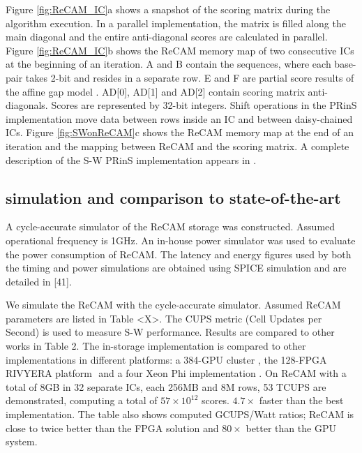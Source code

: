 \documentclass{superfri}
\begin{document}
Figure \ref{fig:ReCAM_IC}a shows a snapshot of the scoring matrix during the algorithm execution. In a parallel implementation, the matrix is filled along the main diagonal and the entire anti-diagonal scores are calculated in parallel. Figure \ref{fig:ReCAM_IC}b shows the ReCAM memory map of two consecutive ICs at the beginning of an iteration. A and B contain the sequences, where each base-pair takes 2-bit and resides in a separate row. E and F are partial score results of the affine gap model \cite{giridhar2013exploring}. AD[0], AD[1] and AD[2] contain scoring matrix anti-diagonals. Scores are represented by 32-bit integers. Shift operations in the PRinS implementation move data between rows inside an IC and between daisy-chained ICs. Figure \ref{fig:SWonReCAM}c shows the ReCAM memory map at the end of an iteration and the mapping between ReCAM and the scoring matrix. A complete description of the S-W PRinS implementation appears in \cite{kaplan2017resistive}.

\subsection{simulation and comparison to state-of-the-art}
\label{sec:SW_simulation}
A cycle-accurate simulator of the ReCAM storage was constructed. Assumed operational frequency is 1GHz. An in-house power simulator was used to evaluate the power consumption of ReCAM. The latency and energy figures used by both the timing and power simulations are obtained using SPICE simulation and are detailed in [41]. 


We simulate the ReCAM with the cycle-accurate simulator. Assumed ReCAM parameters are listed in Table <X>. The CUPS metric (Cell Updates per Second) is used to measure S-W performance. Results are compared to other works in Table 2. The in-storage implementation is compared to other implementations in different platforms: a 384-GPU cluster \cite{de2016cudalign}, the 128-FPGA RIVYERA platform ‎\cite{wienbrandt2014fpga} and a four Xeon Phi implementation \cite{liu2014swaphi}. On ReCAM with a total of 8GB in 32 separate ICs, each 256MB and 8M rows, 53 TCUPS are demonstrated, computing a total of $57\times10^{12}$ scores. $4.7\times$ faster than the best implementation. The table also shows computed GCUPS/Watt ratios; ReCAM is close to twice better than the FPGA solution and $80\times$ better than the GPU system.

\end{document}
